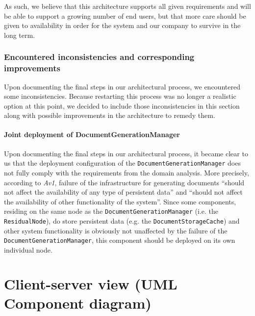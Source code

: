 \documentclass[a4paper,10pt]{article}
\begin{document}
As such, we believe that this architecture supports all given requirements and will be able to support a growing number of end users, but that more care should be given to availability in order for the system and our company to survive in the long term.

\subsubsection*{Encountered inconsistencies and corresponding improvements}
Upon documenting the final steps in our architectural process, we encountered some inconsistencies. Because restarting this process was no longer a realistic option at this point, we decided to include those inconsistencies in this section along with possible improvements in the architecture to remedy them.
\paragraph{Joint deployment of DocumentGenerationManager}
Upon documenting the final steps in our architectural process, it became clear to us that the deployment configuration of the \texttt{DocumentGenerationManager} does not fully comply with the requirements from the domain analysis. More precisely, according to \textit{Av1}, failure of the infrastructure for generating documents ``should not affect the availability of any type of persistent data'' and ``should not affect the availability of other functionality of the system''. Since some components, residing on the same node as the \texttt{DocumentGenerationManager} (i.e. the \texttt{ResidualNode}), do store persistent data (e.g. the \texttt{DocumentStorageCache}) and other system functionality is obviously not unaffected by the failure of the \texttt{DocumentGenerationManager}, this component should be deployed on its own individual node.

\section{Client-server view (UML Component diagram)}\label{sec:client-server}
\end{document}

